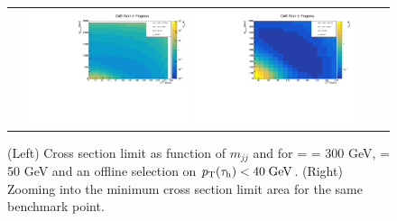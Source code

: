\begin{figure}[tbh!]
	\centering
	\begin{tabular}{cc}
		\includegraphics[width=0.45\textwidth]{analysis/pics/JetInvMass_vs_MET_xsec_chi300_lsp050_taupt40.pdf}
		\includegraphics[width=0.45\textwidth]{analysis/pics/JetInvMass_vs_MET_xsec_chi300_lsp050_taupt40_zoom.pdf} 		
	\end{tabular}
	\caption{(Left) Cross section limit as function of $m_{jj}$ and \met for \charginopm = \neutralinotwo = 300 GeV, \neutralinoone = 50 GeV and an offline selection on $p_{\text{T}}(\tau_{\text{h}}) <  40\;\text{Ge}\kern-0.06667em\text{V}$. (Right) Zooming into the minimum cross section limit area for the same benchmark point.}
	\label{fig::JetInvMass_vs_MET_xsec_chi300_lsp050_taupt40}
\end{figure}

